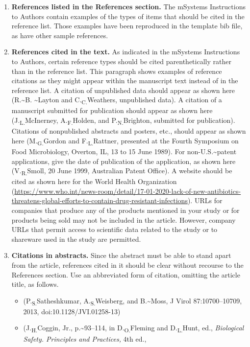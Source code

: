 \documentclass[
  lineno]{asm}
\providecommand{\tightlist}{%
  \setlength{\itemsep}{0pt}\setlength{\parskip}{0pt}}\usepackage{longtable,booktabs,array}
\begin{document}
\begin{enumerate}
\def\labelenumi{\roman{enumi}.}
\item
  \textbf{References listed in the References section.} The mSystems
  Instructions to Authors contain examples of the types of items that
  should be cited in the reference list. Those examples have been
  reproduced in the template bib file, as have other sample references.
\item
  \textbf{References cited in the text.} As indicated in the mSystems
  Instructions to Authors, certain reference types should be cited
  parenthetically rather than in the reference list. This paragraph
  shows examples of reference citations as they might appear within the
  manuscript text instead of in the reference list. A citation of
  unpublished data should appear as shown here (R.\textasciitilde B.
  \textasciitilde Layton and C.\textsubscript{C.}Weathers, unpublished
  data). A citation of a manuscript submitted for publication should
  appear as shown here (J.\textsubscript{L.}McInerney,
  A.\textsubscript{F.}Holden, and P.\textsubscript{N.}Brighton,
  submitted for publication). Citations of nonpublished abstracts and
  posters, etc., should appear as shown here (M.\textsubscript{G.}Gordon
  and F.\textsubscript{L.}Rattner, presented at the Fourth Symposium on
  Food Microbiology, Overton, IL, 13 to 15 June 1989). For
  non-U.S.\textasciitilde patent applications, give the date of
  publication of the application, as shown here
  (V.\textsubscript{R.}Smoll, 20 June 1999, Australian Patent Office). A
  website should be cited as shown here for the World Health
  Organization
  (\url{https://www.who.int/news-room/detail/17-01-2020-lack-of-new-antibiotics-threatens-global-efforts-to-contain-drug-resistant-infections}).
  URLs for companies that produce any of the products mentioned in your
  study or for products being sold may not be included in the article.
  However, company URLs that permit access to scientific data related to
  the study or to shareware used in the study are permitted.
\item
  \textbf{Citations in abstracts.} Since the abstract must be able to
  stand apart from the article, references cited in it should be clear
  without recourse to the References section. Use an abbreviated form of
  citation, omitting the article title, as follows.

  \begin{itemize}
  \tightlist
  \item
    (P.\textsubscript{S.}Satheshkumar, A.\textsubscript{S.}Weisberg, and
    B.\textasciitilde Moss, J Virol 87:10700--10709, 2013,
    doi:10.1128/JVI.01258-13)
  \item
    (J.\textsubscript{H.}Coggin, Jr., p.\textasciitilde93--114, in
    D.\textsubscript{O.}Fleming and D.\textsubscript{L.}Hunt, ed.,
    \emph{Biological Safety. Principles and Practices,} 4th ed.,


\end{itemize}
\end{enumerate}
\end{document}
